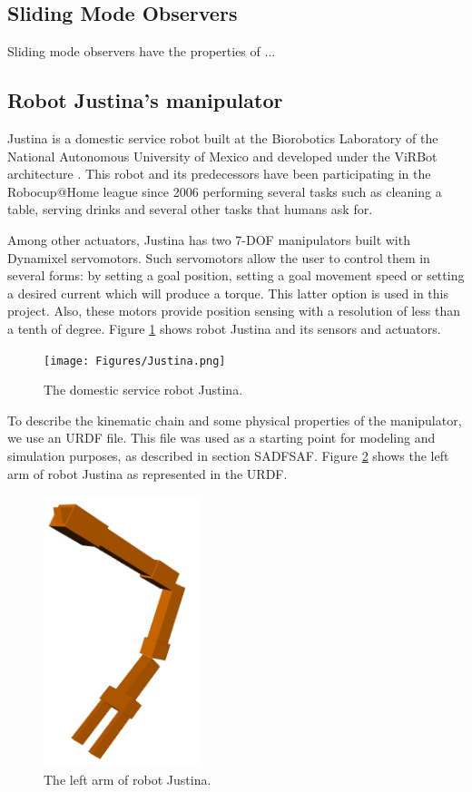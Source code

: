 \documentclass[a4paper, 10pt]{article}
\begin{document}
\subsection{Sliding Mode Observers}
Sliding mode observers have the properties of ...

\subsection{Robot Justina's manipulator}
Justina is a domestic service robot built at the Biorobotics Laboratory of the National Autonomous University of Mexico and developed under the ViRBot architecture \cite{savage2008virbot}. This robot and its predecessors have been participating in the Robocup@Home league \cite{wachsmuth2015robocup} since 2006 performing several tasks such as cleaning a table, serving drinks and several other tasks that humans ask for. 

Among other actuators, Justina has two 7-DOF manipulators built with Dynamixel servomotors. Such servomotors allow the user to control them in several forms: by setting a goal position, setting a goal movement speed or setting a desired current which will produce a torque. This latter option is used in this project. Also, these motors provide position sensing with a resolution of less than a tenth of degree. Figure \ref{fig:Justina} shows robot Justina and its sensors and actuators. 
\begin{figure}
  \centering
  \texttt{[image: Figures/Justina.png]}
  \caption{The domestic service robot Justina.}
  \label{fig:Justina}
\end{figure}

To describe the kinematic chain and some physical properties of the manipulator, we use an URDF file. This file was used as a starting point for modeling and simulation purposes, as described in section SADFSAF. Figure \ref{fig:left_arm} shows the left arm of robot Justina as represented in the URDF.
\begin{figure}
  \centering
  \includegraphics[width=0.4\textwidth]{Figures/left_arm.png}
  \caption{The left arm of robot Justina.}
  \label{fig:left_arm}
\end{figure}
\end{document}
